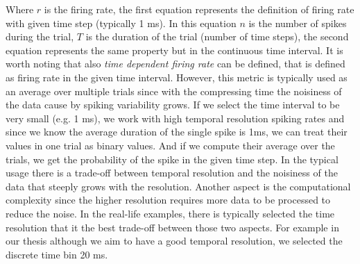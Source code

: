 Where $r$ is the firing rate, the first equation represents the definition of 
firing rate with given time step (typically 1 ms). In this equation $n$ is the 
number of spikes during the trial, $T$ is the duration of the trial (number of 
time steps), the second equation represents the same property but in the continuous
time interval. It is worth noting that also \emph{time dependent firing rate} can 
be defined, that is defined as firing rate in the given time interval. However, this
metric is typically used as an average over multiple trials since with the compressing
time the noisiness of the data cause by spiking variability grows. If we 
select the time interval to be very small (e.g. 1 ms), we work with high temporal 
resolution spiking rates and since we know the average duration of the single spike is 1ms, we 
can treat their values in one trial as binary values. And if we compute their average
over the trials, we get the probability of the spike in the given time step. In the 
typical usage there is a trade-off between temporal resolution and the noisiness of the
data that steeply grows with the resolution. Another aspect is the computational 
complexity since the higher resolution requires more data to be processed to reduce 
the noise. In the real-life examples, there is typically selected the time 
resolution that it the best trade-off between those two aspects. For example in our
thesis although we aim to have a good temporal resolution, we selected the discrete 
time bin 20 ms.
